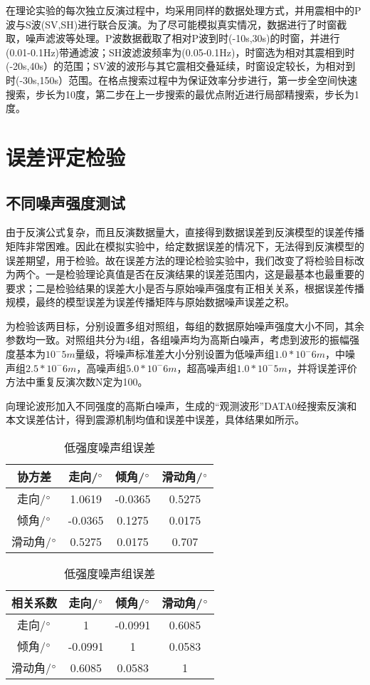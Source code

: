 在理论实验的每次独立反演过程中，均采用同样的数据处理方式，并用震相中的P波与S波(SV,SH)进行联合反演。为了尽可能模拟真实情况，数据进行了时窗截取，噪声滤波等处理。P波数据截取了相对P波到时(-10s,30s)的时窗，并进行(0.01-0.1Hz)带通滤波；SH波滤波频率为(0.05-0.1Hz)，时窗选为相对其震相到时(-20s,40s）的范围；SV波的波形与其它震相交叠延续，时窗设定较长，为相对到时(-30s,150s）范围。在格点搜索过程中为保证效率分步进行，第一步全空间快速搜索，步长为10度，第二步在上一步搜索的最优点附近进行局部精搜索，步长为1度。

\section{误差评定检验}

\subsection{不同噪声强度测试}
由于反演公式复杂，而且反演数据量大，直接得到数据误差到反演模型的误差传播矩阵非常困难。因此在模拟实验中，给定数据误差的情况下，无法得到反演模型的误差期望，用于检验。故在误差方法的理论检验实验中，我们改变了将检验目标改为两个。一是检验理论真值是否在反演结果的误差范围内，这是最基本也最重要的要求；二是检验结果的误差大小是否与原始噪声强度有正相关关系，根据误差传播规模，最终的模型误差为误差传播矩阵与原始数据噪声误差之积。

为检验该两目标，分别设置多组对照组，每组的数据原始噪声强度大小不同，其余参数均一致。对照组共分为4组，各组噪声均为高斯白噪声，考虑到波形的振幅强度基本为$10^-5m$量级，将噪声标准差大小分别设置为低噪声组$1.0*10^-6m$，中噪声组$2.5*10^-6m$，高噪声组$5.0*10^-6m$，超高噪声组$1.0*10^-5m$，并将误差评价方法中重复反演次数N定为100。

向理论波形加入不同强度的高斯白噪声，生成的“观测波形”DATA0经搜索反演和本文误差估计，得到震源机制均值和误差中误差，具体结果如所示。
\begin{table}[ht]
\centering
\caption{低强度噪声组误差}
\label{tab3_01}
    \begin{tabular}{c c c c}
    \hline
    协方差 & 走向/$^\circ$ & 倾角/$^\circ$ & 滑动角/$^\circ$ \\
    \hline
	走向/$^\circ$ 		&1.0619 	&-0.0365	&0.5275\\
	倾角/$^\circ$		&-0.0365	&0.1275		&0.0175\\
	滑动角/$^\circ$	&0.5275		&0.0175		&0.707\\
    \hline
    \end{tabular}
    \begin{tabular}{c c c c}
    \hline
    相关系数 & 走向/$^\circ$ & 倾角/$^\circ$ & 滑动角/$^\circ$ \\
    \hline
	走向/$^\circ$ 		&1 			&-0.0991	&0.6085\\
	倾角/$^\circ$		&-0.0991	&1			&0.0583\\
	滑动角/$^\circ$	&0.6085		&0.0583		&1\\
    \hline
    \end{tabular}
\end{table}

